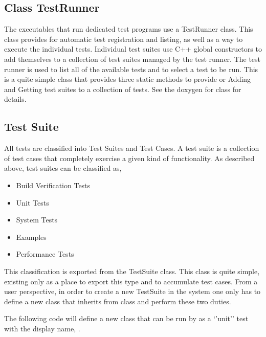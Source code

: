 \documentclass[letterpaper,10pt,english]{sphinxmanual}
\renewcommand{\sphinxcode}[1]{\texttt{\small{#1}}}
\begin{document}
\subsection{Class TestRunner}
\label{\detokenize{test-framework:class-testrunner}}
The executables that run dedicated test programs use a TestRunner class.  This
class provides for automatic test registration and listing, as well as a way to
execute the individual tests.  Individual test suites use C++ global
constructors
to add themselves to a collection of test suites managed by the test runner.
The test runner is used to list all of the available tests and to select a test
to be run.  This is a quite simple class that provides three static methods to
provide or Adding and Getting test suites to a collection of tests.  See the
doxygen for class \sphinxcode{} for details.


\subsection{Test Suite}
\label{\detokenize{test-framework:test-suite}}
All  tests are classified into Test Suites and Test Cases.  A
test suite is a collection of test cases that completely exercise a given kind
of functionality.  As described above, test suites can be classified as,
\begin{itemize}
\item {} 
Build Verification Tests

\item {} 
Unit Tests

\item {} 
System Tests

\item {} 
Examples

\item {} 
Performance Tests

\end{itemize}

This classification is exported from the TestSuite class.  This class is quite
simple, existing only as a place to export this type and to accumulate test
cases.  From a user perspective, in order to create a new TestSuite in the
system one only has to define a new class that inherits from class \sphinxcode{}
and perform these two duties.

The following code will define a new class that can be run by \sphinxcode{}
as a ‘’unit’’ test with the display name, \sphinxcode{\sphinxupquote{my\sphinxhyphen{}test\sphinxhyphen{}suite\sphinxhyphen{}name}}.
\end{document}

